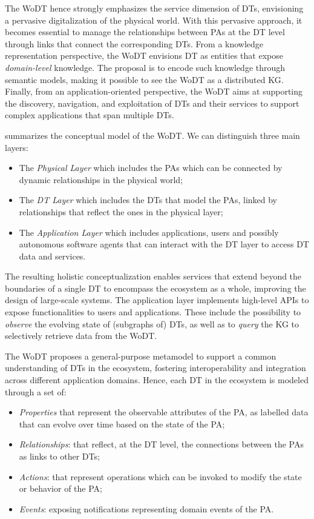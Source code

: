 The \ac{WoDT} hence strongly emphasizes the service dimension of \acp{DT}, envisioning a pervasive digitalization of the physical world.
%
With this pervasive approach, it becomes essential to manage the relationships between \acp{PA} at the \ac{DT} level through links that connect the corresponding \acp{DT}.
%
From a knowledge representation perspective, the \ac{WoDT} envisions \ac{DT} as entities that expose \emph{domain-level} knowledge.
%
The proposal is to encode such knowledge through semantic models, making it possible to see the \ac{WoDT} as a distributed \ac{KG}.
%
Finally, from an application-oriented perspective, the \ac{WoDT} aims at supporting the discovery, navigation, and exploitation of \acp{DT} and their services to support complex applications that span multiple \acp{DT}.

 summarizes the conceptual model of the \ac{WoDT}.
%
We can distinguish three main layers:
\begin{itemize}
    \item The \emph{Physical Layer} which includes the \acp{PA} which can be connected by dynamic relationships in the physical world;
    \item The \emph{\acl{DT} Layer} which includes the \acp{DT} that model the \acp{PA}, linked by relationships that reflect the ones in the physical layer;
    \item The \emph{Application Layer} which includes applications, users and possibly autonomous software agents that can interact with the \ac{DT} layer to access \ac{DT} data and services.
\end{itemize}

The resulting holistic conceptualization enables services that extend beyond the boundaries of a single \ac{DT} to encompass the ecosystem as a whole, improving the design of large-scale systems.
%
The application layer implements high-level \acp{API} to expose functionalities to users and applications.
%
These include the possibility to \emph{observe} the evolving state of (subgraphs of) \acp{DT}, as well as to \emph{query} the \ac{KG} to selectively retrieve data from the \ac{WoDT}. 

The \ac{WoDT} proposes a general-purpose metamodel to support a common understanding of \acp{DT} in the ecosystem, fostering interoperability and integration across different application domains.
Hence, each \ac{DT} in the ecosystem is modeled through a set of:
\begin{itemize}
    \item \textit{Properties} that represent the observable attributes of the \ac{PA}, as labelled data that can evolve over time based on the state of the \ac{PA};
    \item \textit{Relationships}: that reflect, at the \ac{DT} level, the connections between the \acp{PA} as links to other \acp{DT};
    \item \textit{Actions}: that represent operations which can be invoked to modify the state or behavior of the \ac{PA};
    \item \textit{Events}: exposing notifications representing domain events of the \ac{PA}.
\end{itemize}

